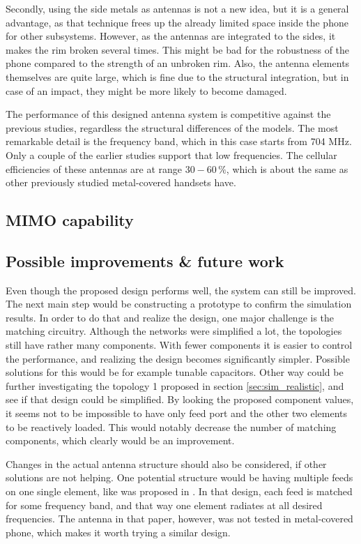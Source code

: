 Secondly, using the side metals as antennas is not a new idea, but it is a general advantage, as that technique frees up the already limited space inside the phone for other subsystems. However, as the antennas are integrated to the sides, it makes the rim broken several times. This might be bad for the robustness of the phone compared to the strength of an unbroken rim. Also, the antenna elements themselves are quite large, which is fine due to the structural integration, but in case of an impact, they might be more likely to become damaged.

The performance of this designed antenna system is competitive against the previous studies, regardless the structural differences of the models. The most remarkable detail is the frequency band, which in this case starts from 704 MHz. Only a couple of the earlier studies support that low frequencies. The cellular efficiencies of these antennas are at range $30-60\,\%$, which is about the same as other previously studied metal-covered handsets have. 


\subsection{MIMO capability}
\label{sec:mimo_cap}



\subsection{Possible improvements \& future work}
\label{sec:improvements}
Even though the proposed design performs well, the system can still be improved. The next main step would be constructing a prototype to confirm the simulation results. In order to do that and realize the design, one major challenge is the matching circuitry. Although the networks were simplified a lot, the topologies still have rather many components. With fewer components it is easier to control the performance, and realizing the design becomes significantly simpler. Possible solutions for this would be for example tunable capacitors. Other way could be further investigating the topology 1 proposed in section \ref{sec:sim_realistic}, and see if that design could be simplified. By looking the proposed component values, it seems not to be impossible to have only feed port and the other two elements to be reactively loaded. This would notably decrease the number of matching components, which clearly would be an improvement.

Changes in the actual antenna structure should also be considered, if other solutions are not helping. One potential structure would be having multiple feeds on one single element, like was proposed in \cite{valkonen_multifeed}. In that design, each feed is matched for some frequency band, and that way one element radiates at all desired frequencies. The antenna in that paper, however, was not tested in metal-covered phone, which makes it worth trying a similar design.

